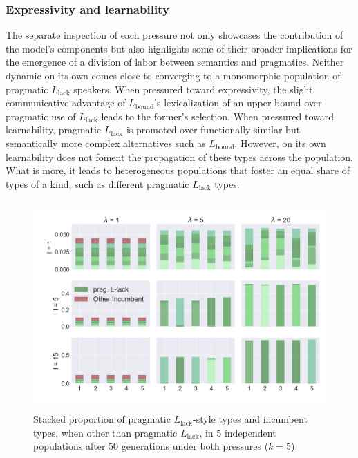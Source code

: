 \documentclass[a4paper, 11pt]{article}
\newcommand{\mylang}[1]{\ensuremath{L_{\text{#1}}}\xspace} %
\newcommand{\Lbound}{\mylang{bound}}
\newcommand{\Llack}{\mylang{lack}}
\begin{document}
\subsubsection{Expressivity and learnability}
The separate inspection of each pressure not only showcases the contribution of the model's components but also highlights some of their broader implications for the emergence of a division of labor between semantics and pragmatics. Neither dynamic on its own comes close to converging to a monomorphic population of pragmatic $\Llack$ speakers. When pressured toward expressivity, the slight communicative advantage of $\Lbound$'s lexicalization of an upper-bound over pragmatic use of $\Llack$ leads to the former's selection. When pressured toward learnability, pragmatic $\Llack$ is promoted over functionally similar but semantically more complex alternatives such as $\Lbound$. However, on its own learnability does not foment the propagation of these types across the population. What is more, it leads to heterogeneous populations that foster an equal share of types of a kind, such as different pragmatic $\Llack$ types.

\begin{figure}
\centering
\includegraphics[width=1\textwidth,height=8cm,keepaspectratio]{./plots/fig3-r+m}
\caption{Stacked proportion of pragmatic $\Llack$-style types and incumbent types, when other than pragmatic $\Llack$, in $5$ independent populations after $50$ generations under both pressures ($k = 5$).}
\label{fig:rmd}
\end{figure}
\end{document}
